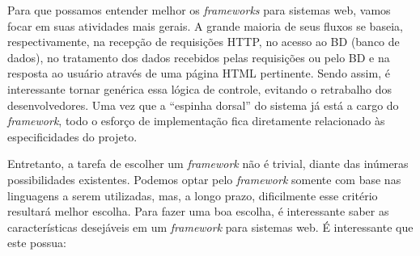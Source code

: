 Para que possamos entender melhor os \textit{frameworks} para sistemas web, vamos focar em suas atividades mais gerais. A grande maioria de seus fluxos se baseia, respectivamente, na recepção de requisições HTTP, no acesso ao BD (banco de dados),
no tratamento dos dados recebidos pelas requisições ou pelo BD e na resposta ao usuário através de uma página HTML pertinente. Sendo assim, é interessante tornar genérica essa lógica de controle, evitando o retrabalho dos desenvolvedores. Uma vez que a ``espinha dorsal'' do sistema já está a cargo do \textit{framework}, todo o esforço de implementação fica diretamente relacionado às especificidades do projeto.

Entretanto, a tarefa de escolher um \textit{framework} não é trivial, diante das inúmeras possibilidades existentes. Podemos optar pelo \textit{framework} somente com base nas linguagens a serem utilizadas, mas, a longo prazo, dificilmente esse critério resultará melhor escolha. Para fazer uma boa escolha, é interessante saber as características desejáveis em um \textit{framework} para sistemas web. É interessante que este possua:~\cite{frameworkexplain}
